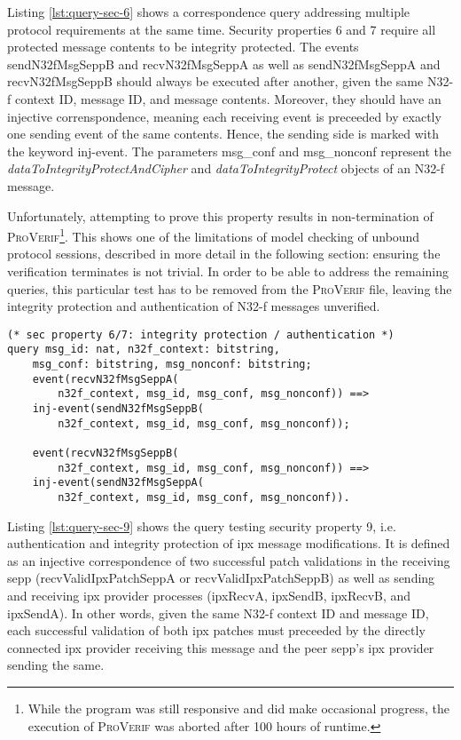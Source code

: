 Listing \ref{lst:query-sec-6} shows a correspondence query addressing multiple protocol requirements at the same time.
Security properties 6 and 7 require all protected message contents to be integrity protected.
The events {\sffamily sendN32fMsgSeppB} and {\sffamily recvN32fMsgSeppA} as well as {\sffamily sendN32fMsgSeppA} and {\sffamily recvN32fMsgSeppB} should always be executed after another, given the same N32-f context ID, message ID, and message contents.
Moreover, they should have an injective correnspondence, meaning each receiving event is preceeded by exactly one sending event of the same contents.
Hence, the sending side is marked with the keyword {\sffamily inj-event}.
The parameters {\sffamily msg\_conf} and {\sffamily msg\_nonconf} represent the \textit{dataToIntegrityProtectAndCipher} and \textit{dataToIntegrityProtect} objects of an N32-f message.

Unfortunately, attempting to prove this property results in non-termination of \textsc{ProVerif}\footnote{While the program was still responsive and did make occasional progress, the execution of \textsc{ProVerif} was aborted after 100 hours of runtime.}.
This shows one of the limitations of model checking of unbound protocol sessions, described in more detail in the following section: ensuring the verification terminates is not trivial.
In order to be able to address the remaining queries, this particular test has to be removed from the \textsc{ProVerif} file, leaving the integrity protection and authentication of N32-f messages unverified.

\begin{lstlisting}[caption={Query for security property 6 and 7},label={lst:query-sec-6},firstnumber=221]
(* sec property 6/7: integrity protection / authentication *)
query msg_id: nat, n32f_context: bitstring,
    msg_conf: bitstring, msg_nonconf: bitstring;
    event(recvN32fMsgSeppA(
        n32f_context, msg_id, msg_conf, msg_nonconf)) ==>
    inj-event(sendN32fMsgSeppB(
        n32f_context, msg_id, msg_conf, msg_nonconf));

    event(recvN32fMsgSeppB(
        n32f_context, msg_id, msg_conf, msg_nonconf)) ==>
    inj-event(sendN32fMsgSeppA(
        n32f_context, msg_id, msg_conf, msg_nonconf)).
\end{lstlisting}

Listing \ref{lst:query-sec-9} shows the query testing security property 9, i.e. authentication and integrity protection of \gls{ipx} message modifications.
It is defined as an injective correspondence of two successful patch validations in the receiving \gls{sepp} ({\sffamily recvValidIpxPatchSeppA} or {\sffamily recvValidIpxPatchSeppB}) as well as sending and receiving \gls{ipx} provider processes ({\sffamily ipxRecvA}, {\sffamily ipxSendB}, {\sffamily ipxRecvB}, and {\sffamily ipxSendA}).
In other words, given the same N32-f context ID and message ID, each successful validation of both \gls{ipx} patches must preceeded by the directly connected \gls{ipx} provider receiving this message and the peer \gls{sepp}'s \gls{ipx} provider sending the same.

